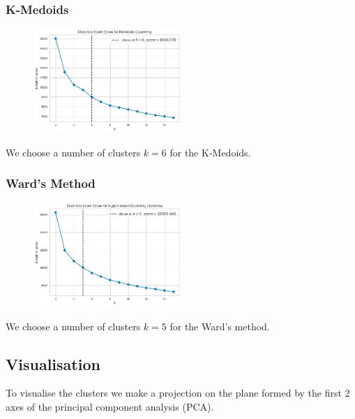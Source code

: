 \documentclass[12pt,a4paper,openany,UKenglish]{scrreprt}
\begin{document}
\subsubsection{K-Medoids}
\begin{figure}[H]
	\centering
	\includegraphics[width=0.5\textwidth]{../Images/FMedoidsElbow.png}
\end{figure}
We choose a number of clusters $k=6$ for the K-Medoids.

\subsubsection{Ward's Method}
\begin{figure}[H]
	\centering
	\includegraphics[width=0.5\textwidth]{../Images/FHierElbow.png}
\end{figure}
We choose a number of clusters $k=5$ for the Ward's method.

\subsection{Visualisation}
To visualise the clusters we make a projection on the plane formed by the first 2 axes of the principal component analysis (PCA).
\end{document}
